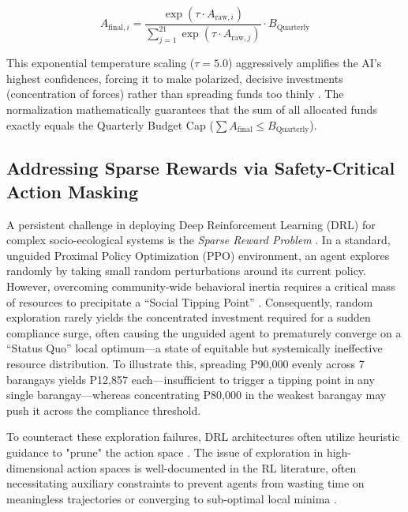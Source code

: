 \begin{equation}
   A_{\mathrm{final}, i} = \frac{\exp(\tau \cdot A_{\mathrm{raw}, i})}{\sum_{j=1}^{21} \exp(\tau \cdot A_{\mathrm{raw}, j})} \cdot B_{\mathrm{Quarterly}}
   \label{eq:softmax_constraint}
\end{equation}

This exponential temperature scaling ($\tau=5.0$) aggressively amplifies the AI's highest confidences, forcing it to make polarized, decisive investments (concentration of forces) rather than spreading funds too thinly \citep{Abdallah2021}. The normalization mathematically guarantees that the sum of all allocated funds exactly equals the Quarterly Budget Cap ($\sum A_{\mathrm{final}} \le B_{\mathrm{Quarterly}}$).

\subsection{Addressing Sparse Rewards via Safety-Critical Action Masking}
\label{subsec:action_masking}

A persistent challenge in deploying Deep Reinforcement Learning (DRL) for complex socio-ecological systems is the \textit{Sparse Reward Problem} \citep{Vecerik2018}. In a standard, unguided Proximal Policy Optimization (PPO) environment, an agent explores randomly by taking small random perturbations around its current policy. However, overcoming community-wide behavioral inertia requires a critical mass of resources to precipitate a ``Social Tipping Point'' \citep{Nyborg2016}. Consequently, random exploration rarely yields the concentrated investment required for a sudden compliance surge, often causing the unguided agent to prematurely converge on a ``Status Quo'' local optimum---a state of equitable but systemically ineffective resource distribution. To illustrate this, spreading P90,000 evenly across 7 barangays yields P12,857 each—insufficient to trigger a tipping point in any single barangay—whereas concentrating P80,000 in the weakest barangay may push it across the compliance threshold.

To counteract these exploration failures, DRL architectures often utilize heuristic guidance to "prune" the action space \citep{Cheng2021}. The issue of exploration in high-dimensional action spaces is well-documented in the RL literature, often necessitating auxiliary constraints to prevent agents from wasting time on meaningless trajectories or converging to sub-optimal local minima \citep{Vecerik2018}. 

